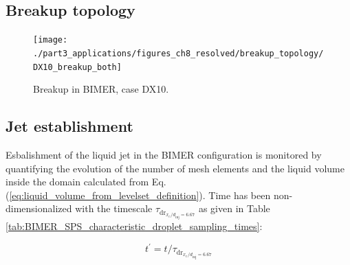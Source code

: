 \clearpage

\subsection{Breakup topology}
\label{ch8:subsec_BIMER_breakup_topology}

\begin{figure}[ht]
\centering
\texttt{[image: ./part3\_applications/figures\_ch8\_resolved/breakup\_topology/DX10\_breakup\_both]}
\caption{Breakup in BIMER, case DX10. }
\label{fig:BIMER_breakup_topology}
\end{figure}


\subsection{Jet establishment}

Esbalishment of the liquid jet in the BIMER configuration is monitored by quantifying the evolution of the number of mesh elements and the liquid volume inside the domain calculated from Eq. (\ref{eq:liquid_volume_from_levelset_definition}). Time has been non-dimensionalized with the timescale $\tau_{\mathrm{dr}_{x_c/d_\mathrm{inj}=6.67}}$ as given in Table \ref{tab:BIMER_SPS_characteristic_droplet_sampling_times}:


\begin{equation}
\label{eq:t_prime_BIMER_with_tau_drx10}
t^{\prime} = t / \tau_{\mathrm{dr}_{x_c/d_\mathrm{inj}=6.67}}
\end{equation}

